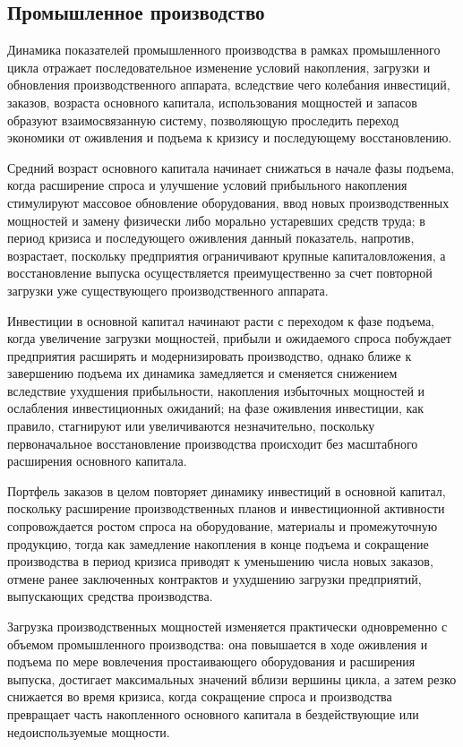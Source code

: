 \subsection{Промышленное производство}
Динамика показателей промышленного производства в рамках промышленного цикла отражает последовательное изменение условий накопления, загрузки и обновления производственного аппарата, вследствие чего колебания инвестиций, заказов, возраста основного капитала, использования мощностей и запасов образуют взаимосвязанную систему, позволяющую проследить переход экономики от оживления и подъема к кризису и последующему восстановлению.

Средний возраст основного капитала начинает снижаться в начале фазы подъема, когда расширение спроса и улучшение условий прибыльного накопления стимулируют массовое обновление оборудования, ввод новых производственных мощностей и замену физически либо морально устаревших средств труда; в период кризиса и последующего оживления данный показатель, напротив, возрастает, поскольку предприятия ограничивают крупные капиталовложения, а восстановление выпуска осуществляется преимущественно за счет повторной загрузки уже существующего производственного аппарата.

Инвестиции в основной капитал начинают расти с переходом к фазе подъема, когда увеличение загрузки мощностей, прибыли и ожидаемого спроса побуждает предприятия расширять и модернизировать производство, однако ближе к завершению подъема их динамика замедляется и сменяется снижением вследствие ухудшения прибыльности, накопления избыточных мощностей и ослабления инвестиционных ожиданий; на фазе оживления инвестиции, как правило, стагнируют или увеличиваются незначительно, поскольку первоначальное восстановление производства происходит без масштабного расширения основного капитала.

Портфель заказов в целом повторяет динамику инвестиций в основной капитал, поскольку расширение производственных планов и инвестиционной активности сопровождается ростом спроса на оборудование, материалы и промежуточную продукцию, тогда как замедление накопления в конце подъема и сокращение производства в период кризиса приводят к уменьшению числа новых заказов, отмене ранее заключенных контрактов и ухудшению загрузки предприятий, выпускающих средства производства.

Загрузка производственных мощностей изменяется практически одновременно с объемом промышленного производства: она повышается в ходе оживления и подъема по мере вовлечения простаивающего оборудования и расширения выпуска, достигает максимальных значений вблизи вершины цикла, а затем резко снижается во время кризиса, когда сокращение спроса и производства превращает часть накопленного основного капитала в бездействующие или недоиспользуемые мощности.

